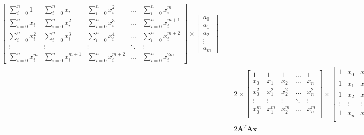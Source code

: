 \documentclass{article}
\newcommand{\x}{\mathbf{x}}
\newcommand{\A}{\mathbf{A}}
\begin{document}
\begin{equation}
\begin{split}
\begin{bmatrix}
        \sum_{i=0}^{n} 1 & \sum_{i=0}^{n} x_i & \sum_{i=0}^{n} x_i ^2 & \ldots & \sum_{i=0}^{n} x_i ^m\\
        \sum_{i=0}^{n} x_i & \sum_{i=0}^{n} x_i ^2 & \sum_{i=0}^{n} x_i ^3 & \ldots & \sum_{i=0}^{n} x_i ^{m+1}\\
        \sum_{i=0}^{n} x_i ^2 & \sum_{i=0}^{n} x_i ^3 & \sum_{i=0}^{n} x_i ^4 & \ldots & \sum_{i=0}^{n} x_i ^{m+2}\\
        \vdots & \vdots & \vdots & \ddots & \vdots \\
        \sum_{i=0}^{n} x_i ^{m} & \sum_{i=0}^{n} x_i ^{m+1} & \sum_{i=0}^{n} x_i ^{m+2} & \ldots & \sum_{i=0}^{n} x_i ^{2m}
    \end{bmatrix}
    \times
    \begin{bmatrix}
        a_0 \\
        a_1 \\
        a_2 \\
        \vdots \\
        a_m
    \end{bmatrix}\\
    & = 2 \times
    \begin{bmatrix}
        1 & 1 & 1 & \ldots & 1 \\
        x_0 & x_1 & x_2 & \ldots & x_n \\
        x_0^2 & x_1^2 & x_2 ^2 & \ldots & x_n^2 \\
        \vdots & \vdots & \vdots & \ddots & \vdots \\
        x_0^m & x_1^m & x_2 ^m & \ldots & x_n^m \\
    \end{bmatrix}
    \times
    \begin{bmatrix}
        1 & x_0 & x_0 ^2 & \ldots & x_0^m \\
        1 & x_1 & x_1 ^2 & \ldots & x_1^m \\
        1 & x_2 & x_2 ^2 & \ldots & x_2^m \\
        \vdots & \vdots & \vdots & \ddots & \vdots \\
        1 & x_n & x_n ^2 & \ldots & x_n^m \\
    \end{bmatrix}
    \times
    \begin{bmatrix}
        a_0 \\
        a_1 \\
        a_2 \\
        \vdots \\
        a_m
    \end{bmatrix}\\
    &= 2\A ^T \A \x
\end{split}
\end{equation}
\end{document}
